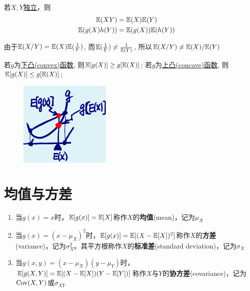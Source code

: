 \begin{proposition}[独立变量的期望]
    若$X,Y$\underline{独立}，则
    \begin{gather*}
        \mathbb{E}(XY)=\mathbb{E}(X)\mathbb{E}(Y) \\
        \mathbb{E}(g(X)h(Y))=\mathbb{E}(g(X))\mathbb{E}(h(Y))
    \end{gather*}
\end{proposition}

\begin{remark}
    由于$\mathbb{E}(X/Y)= \mathbb{E}(X)\mathbb{E}(\frac1{Y})$, 而$\mathbb{E}(\frac1{Y}) \neq \frac1{\mathbb{E}(Y)}$, 所以$\mathbb{E}(X/Y)\neq \mathbb{E}(X)/\mathbb{E}(Y)$
\end{remark}

\begin{proposition}
    若$g$为\underline{下凸(convex)函数}, 则$\mathbb{E}[g(X)] \ge g[\mathbb{E}(X)]$; 若$g$为\underline{上凸(concave)函数}, 则$\mathbb{E}[g(X)] \le  g[\mathbb{E}(X)]$;
\end{proposition}

\begin{figure}[h]
    \centering
    \includegraphics{image/trans_mean.png}
\end{figure}

\section{均值与方差}

\begin{definition}
    \begin{enumerate}
        \item 当$g(x)=x$时，$\mathbb{E}[g(x)]=\mathbb{E}[X]$称作$X$的\textbf{均值}(mean)，记为$\mu_{X}$
        \item 当$g(x)=(x-\mu_{X})^{2}$时，$\mathbb{E}[g(x)]=\mathbb{E}[(X-\mathbb{E}[X])^{2}]$称作$X$的\textbf{方差}(variance)，记为$\sigma^2_{X}$。其平方根称作$X$的\textbf{标准差}(standard deviation)，记为$\sigma_{X}$
        \item 当$g(x,y)=(x-\mu_{X})(y-\mu_{Y})$时，$\mathbb{E}[g(X,Y)]=\mathbb{E}[(X-\mathbb{E}[X])(Y-\mathbb{E}[Y])]$称作$X$与$Y$的\textbf{协方差}(covariance)，记为$\operatorname{Cov}(X,Y)$或$\sigma_{XY}$
    \end{enumerate}
\end{definition}

